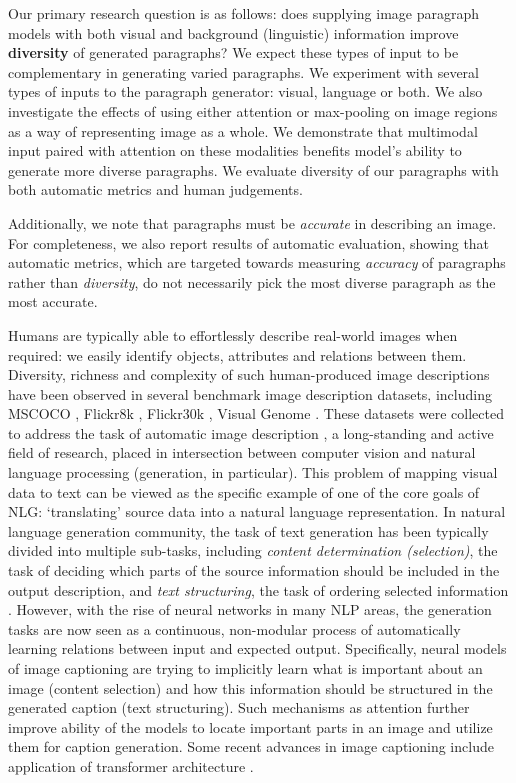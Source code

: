 \documentclass[11pt,a4paper]{article}
\begin{document}
Our primary research question is as follows: does supplying image paragraph models with both visual and background (linguistic) information improve \textbf{diversity} of generated paragraphs?
We expect these types of input to be complementary in generating varied paragraphs.
We experiment with several types of inputs to the paragraph generator: visual, language or both.
We also investigate the effects of using either attention or max-pooling on image regions as a way of representing image as a whole.
We demonstrate that multimodal input paired with attention on these modalities benefits model's ability to generate more diverse paragraphs.
We evaluate diversity of our paragraphs with both automatic metrics and human judgements.

Additionally, we note that paragraphs must be \textit{accurate} in describing an image.
For completeness, we also report results of automatic evaluation, showing that automatic metrics, which are targeted towards measuring \textit{accuracy} of paragraphs rather than \textit{diversity}, do not necessarily pick the most diverse paragraph as the most accurate.


\iffalse
Humans are typically able to effortlessly describe real-world images when required: we easily identify objects, attributes and relations between them.
Diversity, richness and complexity of such human-produced image descriptions have been observed in several benchmark image description datasets, including MSCOCO \cite{lin2014microsoft,chen2015microsoft}, Flickr8k \cite{hodosh2013}, Flickr30k \cite{young-etal-2014-image}, Visual Genome \cite{krishnavisualgenome}.
These datasets were collected to address the task of automatic image description \cite{bernardi2016automatic}, a long-standing and active field of research, placed in intersection between computer vision and natural language processing (generation, in particular).
This problem of mapping visual data to text can be viewed as the specific example of one of the core goals of NLG: `translating' source data into a natural language representation.
In natural language generation community, the task of text generation has been typically divided into multiple sub-tasks, including \textit{content determination (selection)}, the task of deciding which parts of the source information should be included in the output description, and \textit{text structuring}, the task of ordering selected information \cite{Gatt2017}.
However, with the rise of neural networks in many NLP areas, the generation tasks are now seen as a continuous, non-modular process of automatically learning relations between input and expected output. Specifically, neural models of image captioning \cite{kiros14,vinyals2014tell} are trying to implicitly learn what is important about an image (content selection) and how this information should be structured in the generated caption (text structuring).
Such mechanisms as attention \cite{xu2015attend,anderson2017bottomup} further improve ability of the models to locate important parts in an image and utilize them for caption generation. Some recent advances in image captioning include application of transformer architecture \cite{vaswani2017attention,herdade2019image}.
\end{document}

